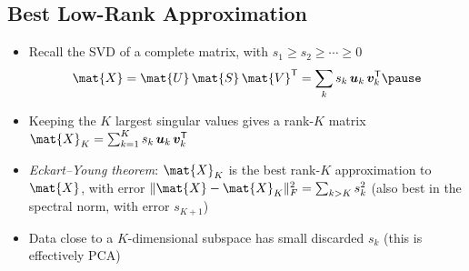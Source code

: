 \begin{slide}
\section[-2]{Best Low-Rank Approximation}

\begin{PauseHighLight}
  \begin{itemize}\squeeze
  \item Recall the SVD of a complete matrix, with
    $s_1\geq s_2\geq\cdots\geq0$
    \begin{align*}
      \mat{X} = \mat{U}\,\mat{S}\,\mat{V}^\tr = \sum_k s_k\,
      \bm{u}_k\,\bm{v}_k^\tr\pause
    \end{align*}
  \item Keeping the $K$ largest singular values gives a rank-$K$
    matrix $\mat{X}_K = \sum_{k=1}^K s_k\, \bm{u}_k\,\bm{v}_k^\tr$\pause
  \item \emph{Eckart--Young theorem}: $\mat{X}_K$ is the best rank-$K$
    approximation to $\mat{X}$, with error
    $\|\mat{X}-\mat{X}_K\|_F^2 = \sum_{k>K} s_k^2$\pause{} (also best in
    the spectral norm, with error $s_{K+1}$)\pause
  \item Data close to a $K$-dimensional subspace has small discarded
    $s_k$\pause{} (this is effectively PCA)\pause
  \end{itemize}
\end{PauseHighLight}

\end{slide}


